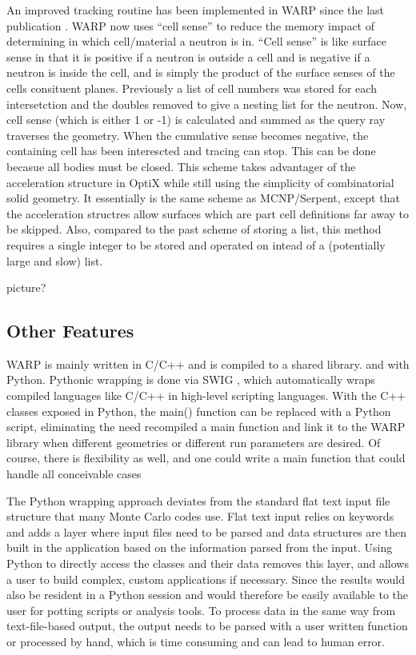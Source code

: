 \documentclass[preprint,12pt]{elsarticle}
\begin{document}
An improved tracking routine has been implemented in WARP since the last publication \cite{dissertation}.  WARP now uses ``cell sense'' to reduce the memory impact of determining in which cell/material a neutron is in.  ``Cell sense'' is like surface sense in that it is positive if a neutron is outside a cell and is negative if a neutron is inside the cell, and is simply the product of the surface senses of the cells consituent planes.  Previously a list of cell numbers was stored for each intersetction and the doubles removed to give a nesting list for the neutron.  Now, cell sense (which is either 1 or -1) is calculated and summed as the query ray traverses the geometry.  When the cumulative sense becomes negative, the containing cell has been interescted and tracing can stop.  This can be done becasue all bodies must be closed.  This scheme takes advantager of the acceleration structure in OptiX while still using the simplicity of combinatorial solid geometry.  It essentially is the same scheme as MCNP/Serpent, except that the acceleration structres allow surfaces which are part cell definitions far away to be skipped.  Also, compared to the past scheme of storing a list, this method requires a single integer to be stored and operated on intead of a (potentially large and slow) list.

picture?


\subsection{Other Features}

WARP is mainly written in C/C++ and is compiled to a shared library.   and  with Python.  Pythonic wrapping is done via SWIG \cite{swig}, which automatically wraps compiled languages like C/C++ in high-level scripting languages.  With the C++ classes exposed in Python, the main() function can be replaced with a Python script, eliminating the need recompiled a main function and link it to the WARP library when different geometries or different run parameters are desired.  Of course, there is flexibility as well, and one could write a main function that could handle all conceivable cases 

The Python wrapping approach deviates from the standard flat text input file structure that many Monte Carlo codes use.  Flat text input relies on keywords and adds a layer where input files need to be parsed and data structures are then built in the application based on the information parsed from the input.  Using Python to directly access the classes and their data removes this layer, and allows a user to build complex, custom applications if necessary.  Since the results would also be resident in a Python session and would therefore be easily available to the user for potting scripts or analysis tools.  To process data in the same way from text-file-based output, the output needs to be parsed with a user written function or processed by hand, which is time consuming and can lead to human error.
\end{document}
